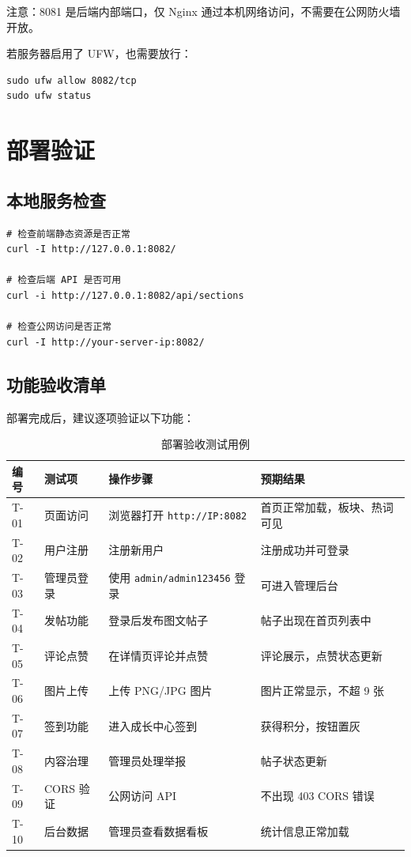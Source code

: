 \documentclass[bwprint]{report}
\begin{document}
注意：8081 是后端内部端口，仅 Nginx 通过本机网络访问，不需要在公网防火墙开放。

若服务器启用了 UFW，也需要放行：

\begin{lstlisting}
sudo ufw allow 8082/tcp
sudo ufw status
\end{lstlisting}

\section{部署验证}

\subsection{本地服务检查}

\begin{lstlisting}
# 检查前端静态资源是否正常
curl -I http://127.0.0.1:8082/

# 检查后端 API 是否可用
curl -i http://127.0.0.1:8082/api/sections

# 检查公网访问是否正常
curl -I http://your-server-ip:8082/
\end{lstlisting}

\subsection{功能验收清单}

部署完成后，建议逐项验证以下功能：

\begin{table}[H]
    \caption{部署验收测试用例}
    \label{tab:verification}
    \centering
    \small
    \begin{tabular}{p{}p{}p{}p{}}
        \toprule[1.5pt]
        编号 & 测试项 & 操作步骤 & 预期结果 \\
        \midrule[1pt]
        T-01 & 页面访问 & 浏览器打开 \texttt{http://IP:8082} & 首页正常加载，板块、热词可见 \\
        T-02 & 用户注册 & 注册新用户 & 注册成功并可登录 \\
        T-03 & 管理员登录 & 使用 \texttt{admin/admin123456} 登录 & 可进入管理后台 \\
        T-04 & 发帖功能 & 登录后发布图文帖子 & 帖子出现在首页列表中 \\
        T-05 & 评论点赞 & 在详情页评论并点赞 & 评论展示，点赞状态更新 \\
        T-06 & 图片上传 & 上传 PNG/JPG 图片 & 图片正常显示，不超 9 张 \\
        T-07 & 签到功能 & 进入成长中心签到 & 获得积分，按钮置灰 \\
        T-08 & 内容治理 & 管理员处理举报 & 帖子状态更新 \\
        T-09 & CORS 验证 & 公网访问 API & 不出现 403 CORS 错误 \\
        T-10 & 后台数据 & 管理员查看数据看板 & 统计信息正常加载 \\
        \bottomrule[1.5pt]
    \end{tabular}
\end{table}
\end{document}
